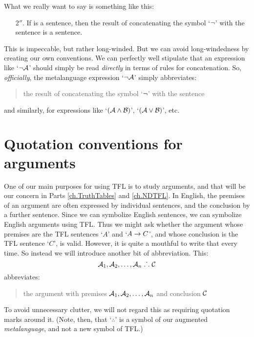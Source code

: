What we really want to say is something like this:
	\begin{enumerate}
		\item[2$''$.] If  is a sentence, then the result of concatenating the symbol `$\neg$' with the sentence  is a sentence.
	\end{enumerate}
This is impeccable, but rather long-winded. %
But we can avoid long-windedness by creating our own conventions. We can perfectly well stipulate that an expression like `$\neg \mathcal{A}$' should simply be read \emph{directly} in terms of rules for concatenation. So, \emph{officially}, the metalanguage expression `$\neg \mathcal{A}$'
simply abbreviates:
\begin{quote}
	the result of concatenating the symbol `$\neg$' with the sentence 
\end{quote}
and similarly, for expressions like `$(\mathcal{A} \wedge \mathcal{B})$', `$(\mathcal{A} \vee \mathcal{B})$', etc.


\section{Quotation conventions for arguments}
One of our main purposes for using TFL is to study arguments, and that will be our concern in Parts \ref{ch.TruthTables} and \ref{ch.NDTFL}. In English, the premises of an argument are often expressed by individual sentences, and the conclusion by a further sentence. Since we can symbolize English sentences, we can symbolize English arguments using TFL. Thus we might ask whether the argument whose premises are the TFL sentences `$A$' and `$A \rightarrow C$', and whose conclusion is the TFL sentence `$C$', is valid. However, it is quite a mouthful to write that every time. So instead we will introduce another bit of abbreviation. This:
	$$\mathcal{A}_1, \mathcal{A}_2, \ldots, \mathcal{A}_n \mathrel{\ldotp\dot{}\,\ldotp} \mathcal{C}$$
abbreviates:
	\begin{quote}
		the argument with premises $\mathcal{A}_1, \mathcal{A}_2, \ldots, \mathcal{A}_n$ and conclusion $\mathcal{C}$
	\end{quote}
To avoid unnecessary clutter, we will not regard this as requiring quotation marks around it. (Note, then, that `$\therefore$' is a symbol of our augmented \emph{metalanguage}, and not a new symbol of TFL.)
